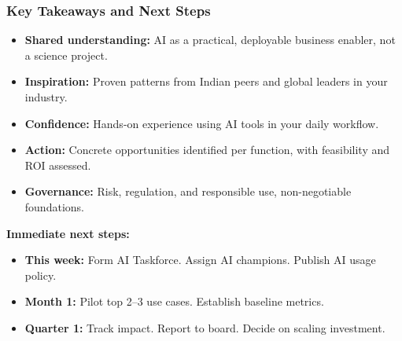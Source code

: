 \begin{frame}[fragile]\frametitle{Key Takeaways and Next Steps}

\begin{itemize}
  \item \textbf{Shared understanding:} AI as a practical, deployable business enabler, not a science project.
  \item \textbf{Inspiration:} Proven patterns from Indian peers and global leaders in your industry.
  \item \textbf{Confidence:} Hands-on experience using AI tools in your daily workflow.
  \item \textbf{Action:} Concrete opportunities identified per function, with feasibility and ROI assessed.
  \item \textbf{Governance:} Risk, regulation, and responsible use, non-negotiable foundations.
\end{itemize}

\vspace{0.4em}
\textbf{Immediate next steps:}
\begin{itemize}
  \item \textbf{This week:} Form AI Taskforce. Assign AI champions. Publish AI usage policy.
  \item \textbf{Month 1:} Pilot top 2--3 use cases. Establish baseline metrics.
  \item \textbf{Quarter 1:} Track impact. Report to board. Decide on scaling investment.
\end{itemize}

\end{frame}

